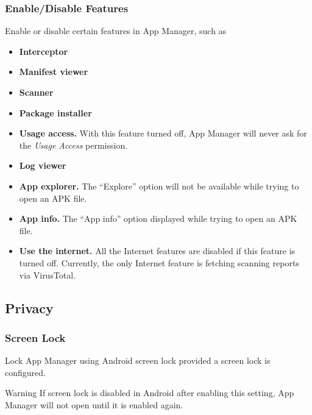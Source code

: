 \subsubsection{Enable/Disable Features}\label{subsubsec:enable/disable-features} %
Enable or disable certain features in App Manager, such as
\begin{itemize}
    \item \textbf{Interceptor}
    \item \textbf{Manifest viewer}
    \item \textbf{Scanner}
    \item \textbf{Package installer}
    \item \textbf{Usage access.} With this feature turned off, App Manager will never ask for the \textit{Usage Access} permission.
    \item \textbf{Log viewer}
    \item \textbf{App explorer.} The ``Explore'' option will not be available while trying to open an APK file.
    \item \textbf{App info.} The ``App info'' option displayed while trying to open an APK file.
    \item \textbf{Use the internet.} All the Internet features are disabled if this feature is turned off.
    Currently, the only Internet feature is fetching scanning reports via VirusTotal.
\end{itemize}


\subsection{Privacy}\label{subsec:privacy} %

\subsubsection{Screen Lock}\label{subsubsec:screen-lock} %
Lock App Manager using Android screen lock provided a screen lock is configured.

\begin{warning}{Warning}
    If screen lock is disabled in Android after enabling this setting, App Manager will not open until it is enabled again.
\end{warning}


